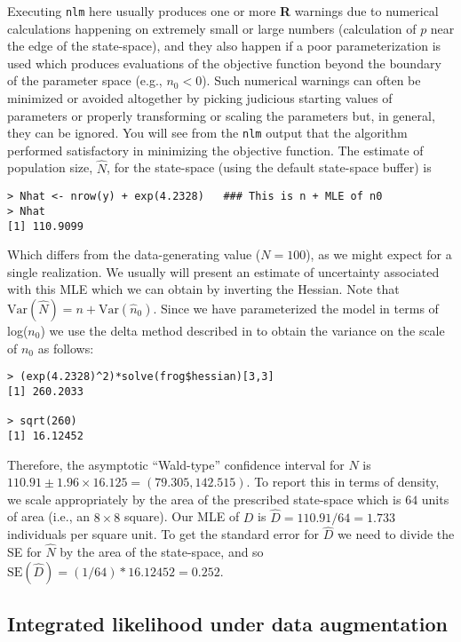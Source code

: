 Executing \mbox{\tt nlm} here usually produces one or more {\bf R}
warnings due to numerical calculations happening on extremely small or
large numbers (calculation of $p$ near the edge of the state-space),
and they also happen if a poor parameterization is used which produces
evaluations of the objective function beyond the boundary of the
parameter space (e.g., $n_{0} < 0$). Such numerical warnings can often
be minimized or avoided altogether by picking judicious starting
values of parameters or properly transforming or scaling the
parameters but, in general, they can be ignored.  You will see from
the \mbox{\tt nlm} output that the algorithm performed satisfactory in
minimizing the objective function.  The estimate of population size,
$\hat{N}$, for the state-space (using the default state-space buffer)
is
\begin{verbatim}
> Nhat <- nrow(y) + exp(4.2328)   ### This is n + MLE of n0
> Nhat
[1] 110.9099
\end{verbatim}
Which differs from the data-generating value ($N=100$), as we might
expect for a single realization. We usually will present an estimate of uncertainty associated
with this MLE which we can obtain by inverting the Hessian. Note that
$\mbox{Var}(\hat{N}) = n + \mbox{Var}(\hat{n}_{0})$.
Since we
have parameterized the model in terms of log($n_{0}$) we use the delta
method
described in 
\citet[][Appendix F4]{williams_etal:2002}  \citep[see also][]{verhoef:2012}
 to obtain the variance on the scale of $n_{0}$ as
follows:
\begin{verbatim}
> (exp(4.2328)^2)*solve(frog$hessian)[3,3]
[1] 260.2033

> sqrt(260)
[1] 16.12452
\end{verbatim}
Therefore, the asymptotic ``Wald-type'' confidence interval for $N$ is
$110.91 \pm 1.96 \times 16.125 = (79.305, 142.515)$. To report this in
terms of density, we scale appropriately by the area of the prescribed
state-space which is $64$ units of area (i.e., an $8 \times 8$ square).
Our MLE of $D$ is $\hat{D} = 110.91/64  = 1.733$ individuals per
square unit. To get the standard error for $\hat{D}$ we need to divide
the SE for $\hat{N}$ by the area of the state-space, and so
$\mbox{SE}(\hat{D}) = (1/64)*16.12452 = 0.252$.






\subsection{Integrated likelihood  under data augmentation } 
\label{mle.sec.intlikDA}

